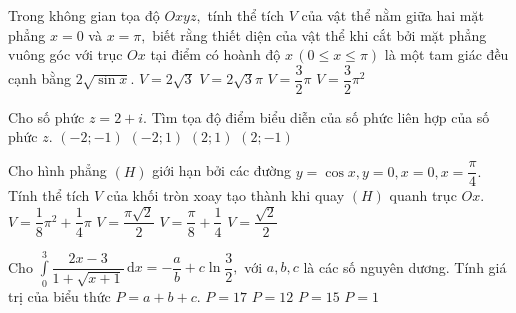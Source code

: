 \begin{ex}%
Trong không gian tọa độ $Oxyz,$ tính thể tích $V$ của vật thể nằm giữa hai mặt phẳng $x=0$ và $x=\pi,$ biết rằng thiết diện của vật thể khi cắt bởi mặt phẳng vuông góc với trục $Ox$ tại điểm có hoành độ $x\, (0\le x\le \pi)$ là một tam giác đều cạnh bằng $2\sqrt{\sin x}.$
\choice
{\True $V=2\sqrt3$}
{$V=2\sqrt3\pi$}
{$V=\dfrac32\pi$}
{$V=\dfrac32\pi^2$}
\end{ex}

\begin{ex}%
Cho số phức $z=2+i.$ Tìm tọa độ điểm biểu diễn của số phức liên hợp của số phức $z$.
\choice
{$(-2;-1)$}
{$(-2;1)$}
{$(2;1)$}
{\True $(2;-1)$}
\end{ex}

\begin{ex}%
Cho hình phẳng $(H)$ giới hạn bởi các đường $y=\cos x, y=0, x=0, x=\dfrac\pi4.$ Tính thể tích $V$ của khối tròn xoay tạo thành khi quay $(H)$ quanh trục $Ox$.
\choice
{\True $V=\dfrac18\pi^2+\dfrac14\pi$}
{$V=\dfrac{\pi\sqrt2}2$}
{$V=\dfrac\pi8+\dfrac14$}
{$V=\dfrac{\sqrt2}2$}
\end{ex}

\begin{ex}%
Cho $\displaystyle \int\limits_{0}^{3} \dfrac{2x-3}{1+\sqrt{x+1}}\mathrm{\,d}x=-\dfrac ab+c\ln\dfrac32,$ với $a, b, c$ là các số nguyên dương. Tính giá trị của biểu thức $P=a+b+c.$
\choice
{\True $P=17$}
{$P=12$}
{$P=15$}
{$P=1$}
\end{ex}

